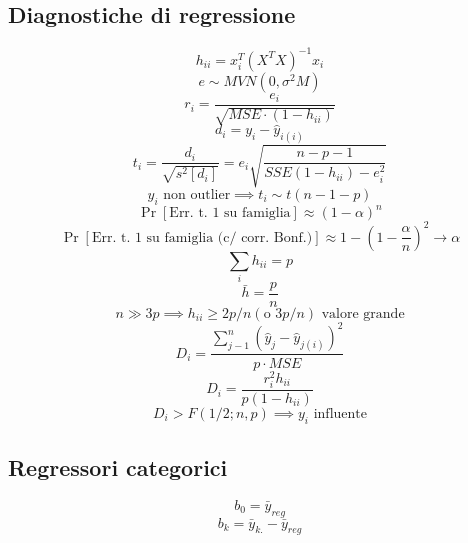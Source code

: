\documentclass[a4paper, landscape]{article}
\begin{document}
\begin{multicols}{3}
\subsection{Diagnostiche di regressione}
\begin{equation}
h_{ii}=x_i^T(X^TX)^{-1}x_i \end{equation}
\begin{equation} e\sim MVN(0,\sigma^2M) \end{equation}
\begin{equation}
r_i=\frac{e_i}{\sqrt{MSE\cdot(1-h_{ii})}} \end{equation}
\begin{equation} d_i=y_i-\hat{y}_{i(i)} \end{equation}
\begin{equation}
t_i=\frac{d_i}{\sqrt{s^2[d_i]}}=e_i\sqrt{\frac{n-p-1}{SSE(1-h_{ii})-e^2_i}} \end{equation}
\begin{equation} y_i\textrm{ non outlier}\implies t_i\sim t(n-1-p)\end{equation}
\begin{equation}
\Pr[\textrm{Err. t. 1 su famiglia}]\approx (1-\alpha)^n \end{equation}
\begin{equation} \Pr[\textrm{Err. t. 1 su famiglia (c/ corr. Bonf.)}] \approx 1-(1-\frac{\alpha}{n})^2 \longrightarrow \alpha \end{equation}
\begin{equation}
\sum_i h_{ii}=p \end{equation}
\begin{equation} \bar{h}=\frac{p}{n} \end{equation}
\begin{equation}
n\gg 3p\implies h_{ii}\geq 2p/n(\textrm{o } 3p/n)\textrm{ valore grande} \end{equation}
\begin{equation} D_i=\frac{\sum_{j-1}^n(\hat{y}_j-\hat{y}_{j(i)})^2}{p\cdot MSE}\end{equation}
\begin{equation}
D_i=\frac{r_i^2h_{ii}}{p(1-h_{ii})} \end{equation}
\begin{equation} D_i > F(1/2;n,p)\implies y_i\textrm{ influente}
\end{equation}
\subsection{Regressori categorici}
\begin{equation}
b_0=\bar{y}_{reg} \end{equation}
\begin{equation} b_k=\bar{y}_{k.}-\bar{y}_{reg}
\end{equation}

\end{multicols}
\end{document}
